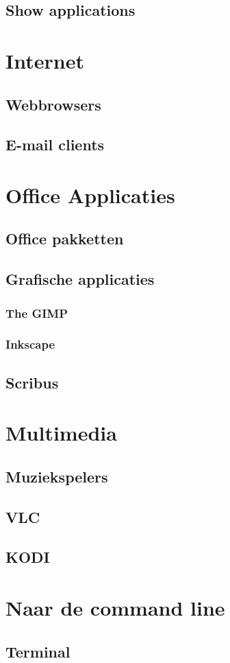 \documentclass[a4paper,12pt,twoside,openright,titlepage]{book}
\begin{document}
\section{Show applications}


\chapter{Internet}
\section{Webbrowsers}

\section{E-mail clients}


\chapter{Office Applicaties}
\section{Office pakketten}

\section{Grafische applicaties}

\subsection{The GIMP}

\subsection{Inkscape}

\section{Scribus}


\chapter{Multimedia}

\section{Muziekspelers}

\section{VLC}

\section{KODI}


\chapter{Naar de command line}
\section{Terminal}


\backmatter
\printindex
\end{document}
